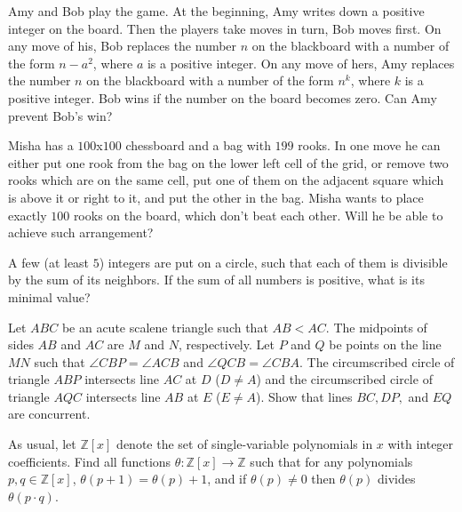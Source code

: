 \documentclass[11pt]{scrartcl}
\begin{document}
\begin{problem}[613633329435671]
Amy and Bob play the game. At the beginning, Amy writes down a positive integer on the board. Then the players take moves in turn, Bob moves first. On any move of his, Bob replaces the number $n$ on the blackboard with a number of the form $n-a^2$, where $a$ is a positive integer. On any move of hers, Amy replaces the number $n$ on the blackboard with a number of the form $n^k$, where $k$ is a positive integer. Bob wins if the number on the board becomes zero.
Can Amy prevent Bob’s win?
\end{problem}
\begin{problem}[614247648874042]
Misha has a $100$x$100$ chessboard and a bag with $199$ rooks. In one move he can either put one rook from the bag on the lower left cell of the grid, or remove two rooks which are on the same cell, put one of them on the adjacent square which is above it or right to it, and put the other in the bag. Misha wants to place exactly $100$ rooks on the board, which don't beat each other. Will he be able to achieve such arrangement?
\end{problem}
\begin{problem}[616860610609120]
	A few (at least $5$) integers are put on a circle, such that each of them is divisible by the sum of its neighbors. If the sum of all numbers is positive, what is its minimal value?
\end{problem}
\begin{problem}[620564216459483]
Let $ABC$ be an acute scalene triangle such that $AB <AC$. The midpoints of sides $AB$ and $AC$ are $M$ and $N$, respectively. Let $P$ and $Q$ be points on the line $MN$ such that $\angle CBP = \angle ACB$ and $\angle QCB = \angle CBA$. The circumscribed circle of triangle $ABP$ intersects line $AC$ at $D$ ($D\ne A$) and the circumscribed circle of triangle $AQC$ intersects line $AB$ at $E$ ($E \ne A$). Show that lines $BC, DP,$ and $EQ$ are concurrent.
\end{problem}
\begin{problem}[620629352845047]
As usual, let ${\mathbb Z}[x]$ denote the set of single-variable polynomials in $x$ with integer coefficients. Find all functions $\theta : {\mathbb Z}[x] \to {\mathbb Z}$ such that for any polynomials $p,q \in {\mathbb Z}[x]$,
$\theta(p+1) = \theta(p)+1$, and
if $\theta(p) \neq 0$ then $\theta(p)$ divides $\theta(p \cdot q)$.
\end{problem}
\end{document}
